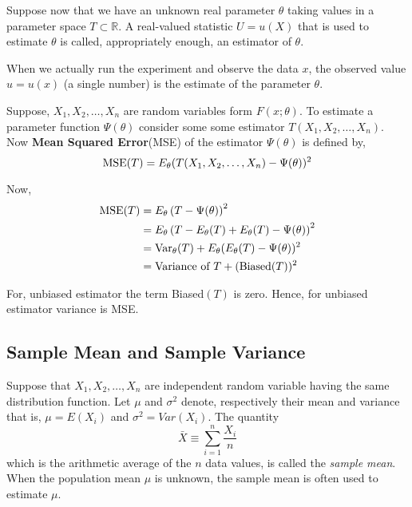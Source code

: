 \begin{definition}[Estimators]
    Suppose now that we have an unknown real parameter $ \theta $ taking values in a parameter space $ T \subset \mathds{R} $. A real-valued statistic $ U = u(X) $ that is used to estimate $ \theta $ is called, appropriately enough, an estimator of $ \theta $.
\end{definition}

When we actually run the experiment and observe the data $ x $, the observed value $ u = u(x) $ (a single number) is the estimate of the parameter $ \theta $.

Suppose, $ X_1, X_2, \ldots , X_n $ are random variables form $ F(x;\theta) $. To estimate a parameter function $ \Psi(\theta) $ consider some some estimator $ T(X_1,X_2,\ldots,X_n) $. Now \textbf{Mean Squared Error}(MSE) of the estimator $ \Psi(\theta) $ is defined by,
\begin{equation}
    \label{eq:MSE}
    \text{MSE}(T) = E_{\theta} (T(X_1,X_2,\ldots,X_n) - \Psi(\theta))^{2} 
\end{equation}

Now,
\begin{align*}
    \text{MSE}(T) &= E_{\theta} \left(T-\Psi(\theta)\right)^{2}\\ 
                &= E_{\theta} \left( T - E_{\theta}(T) + E_{\theta}(T) - \Psi(\theta)  \right)^{2}\\ 
                &= \text{Var}_{\theta}(T) + E_{\theta} (E_{\theta}(T) - \Psi(\theta) )^{2} \\
                &= \text{Variance of }T + (\text{Biased}(T))^{2}
\end{align*}

For, unbiased estimator the term Biased$(T)$ is zero. Hence, for unbiased estimator variance is MSE.

\subsection*{Sample Mean and Sample Variance}
Suppose that $ X_1,X_2,\ldots,X_n $ are independent random variable having the same
distribution function. Let $ \mu $ and $ \sigma ^{2} $ denote, respectively 
their mean and variance that is, $ \mu = E(X_i) $ and $ \sigma ^{2} = Var(X_i) $.
The quantity
\[
	\bar{X} \equiv \sum_{i=1}^{n} \frac{X_i}{n}
\]
which is the arithmetic average of the $ n $ data values, is called the \textit{sample mean}.
When the population mean $ \mu $ is unknown, the sample mean is often used to estimate $ \mu .$

